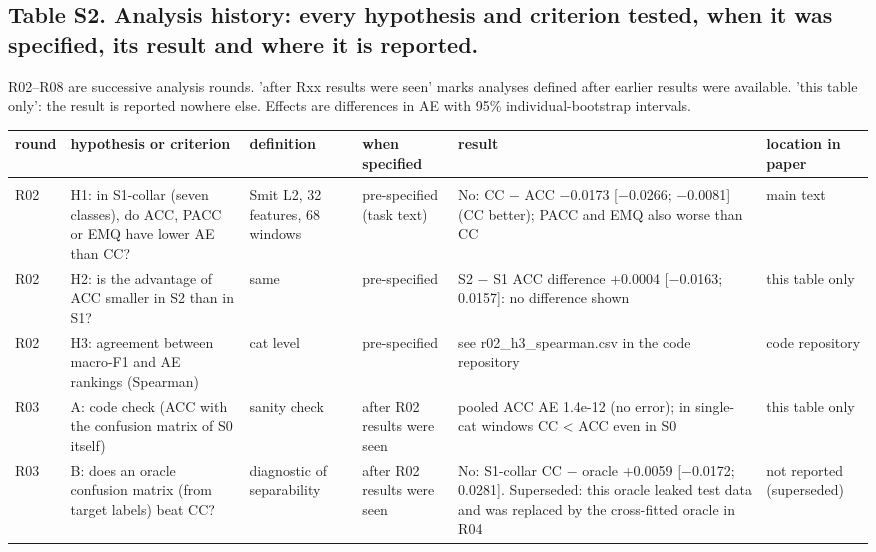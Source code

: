 \documentclass[10pt,a4paper]{article}
\begin{document}
\subsection*{Table S2. Analysis history: every hypothesis and criterion tested, when it was specified, its result and where it is reported.}
{\footnotesize R02--R08 are successive analysis rounds. 'after Rxx results were seen' marks analyses defined after earlier results were available. 'this table only': the result is reported nowhere else. Effects are differences in AE with 95\% individual-bootstrap intervals.\par}\smallskip
{\scriptsize
\setlength{\tabcolsep}{2.5pt}
\begin{longtable}{@{}>{\raggedright\arraybackslash}p{0.8cm}>{\raggedright\arraybackslash}p{4.0cm}>{\raggedright\arraybackslash}p{4.3cm}>{\raggedright\arraybackslash}p{3.2cm}>{\raggedright\arraybackslash}p{8.0cm}>{\raggedright\arraybackslash}p{3.6cm}@{}}
\toprule
\textbf{round} & \textbf{hypothesis or criterion} & \textbf{definition} & \textbf{when specified} & \textbf{result} & \textbf{location in paper} \\
\midrule
\endhead
\midrule \multicolumn{6}{r}{\textit{continued}} \\ \endfoot
\bottomrule
\endlastfoot
R02 & H1: in S1-collar (seven classes), do ACC, PACC or EMQ have lower AE than CC? & Smit L2, 32 features, 68 windows & pre-specified (task text) & No: CC $-$ ACC $-$0.0173 [$-$0.0266; $-$0.0081] (CC better); PACC and EMQ also worse than CC & main text \\
R02 & H2: is the advantage of ACC smaller in S2 than in S1? & same & pre-specified & S2 $-$ S1 ACC difference +0.0004 [$-$0.0163; 0.0157]: no difference shown & this table only \\
R02 & H3: agreement between macro-F1 and AE rankings (Spearman) & cat level & pre-specified & see r02\_h3\_spearman.csv in the code repository & code repository \\
R03 & A: code check (ACC with the confusion matrix of S0 itself) & sanity check & after R02 results were seen & pooled ACC AE 1.4e-12 (no error); in single-cat windows CC < ACC even in S0 & this table only \\
R03 & B: does an oracle confusion matrix (from target labels) beat CC? & diagnostic of separability & after R02 results were seen & No: S1-collar CC $-$ oracle +0.0059 [$-$0.0172; 0.0281]. Superseded: this oracle leaked test data and was replaced by the cross-fitted oracle in R04 & not reported (superseded) \\

\end{longtable}}
\end{document}
